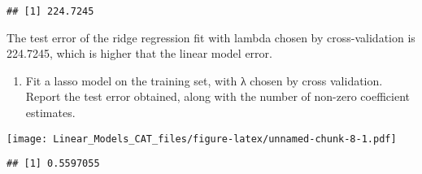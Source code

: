 \documentclass[
]{article}
\newenvironment{Shaded}{\begin{snugshade}}{\end{snugshade}}
\newcommand{\AttributeTok}[1]{\textcolor[rgb]{0.77,0.63,0.00}{#1}}
\newcommand{\CommentTok}[1]{\textcolor[rgb]{0.56,0.35,0.01}{\textit{#1}}}
\newcommand{\DecValTok}[1]{\textcolor[rgb]{0.00,0.00,0.81}{#1}}
\newcommand{\FunctionTok}[1]{\textcolor[rgb]{0.00,0.00,0.00}{#1}}
\newcommand{\NormalTok}[1]{#1}
\newcommand{\OtherTok}[1]{\textcolor[rgb]{0.56,0.35,0.01}{#1}}
\newcommand{\SpecialCharTok}[1]{\textcolor[rgb]{0.00,0.00,0.00}{#1}}
\providecommand{\tightlist}{%
  \setlength{\itemsep}{0pt}\setlength{\parskip}{0pt}}
\begin{document}
\begin{verbatim}
## [1] 224.7245
\end{verbatim}

The test error of the ridge regression fit with lambda chosen by
cross-validation is 224.7245, which is higher that the linear model
error.

\begin{enumerate}
\def\labelenumi{\alph{enumi})}
\setcounter{enumi}{3}
\tightlist
\item
  Fit a lasso model on the training set, with λ chosen by cross
  validation. Report the test error obtained, along with the number of
  non-zero coefficient estimates.
\end{enumerate}

\begin{Shaded}
\end{Shaded}

\texttt{[image: Linear\_Models\_CAT\_files/figure-latex/unnamed-chunk-8-1.pdf]}

\begin{Shaded}
\end{Shaded}

\begin{verbatim}
## [1] 0.5597055
\end{verbatim}

\begin{Shaded}
\end{Shaded}
\end{document}
